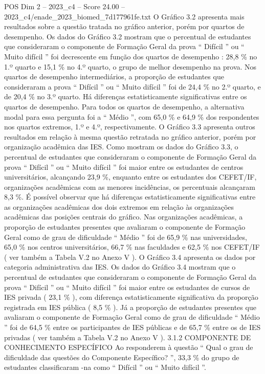 \begin{textsample}{POS Dim 2 – 2023\_c4 – Score 24.00 – 2023\_c4/enade\_2023\_biomed\_7d177961fe.txt}
O Gráfico 3.2 apresenta mais resultados sobre a questão tratada no gráfico anterior, porém por quartos de desempenho.
Os dados do Gráfico 3.2 mostram que o percentual de estudantes que consideraram o componente de Formação Geral da prova “ Difícil ” ou “ Muito difícil ” foi decrescente em função dos quartos de desempenho : 28,8 \% no 1.º quarto e 15,1 \% no 4.º quarto, o grupo de melhor desempenho na prova.
Nos quartos de desempenho intermediários, a proporção de estudantes que consideraram a prova “ Difícil ” ou “ Muito difícil ” foi de 24,4 \% no 2.º quarto, e de 20,4 \% no 3.º quarto.
Há diferenças estatisticamente significativas entre os quartos de desempenho.
Para todos os quartos de desempenho, a alternativa modal para essa pergunta foi a “ Médio ”, com 65,0 \% e 64,9 \% dos respondentes nos quartos extremos, 1.º e 4.º, respectivamente.
O Gráfico 3.3 apresenta outros resultados em relação à mesma questão retratada no gráfico anterior, porém por organização acadêmica das IES.
Como mostram os dados do Gráfico 3.3, o percentual de estudantes que consideraram o componente de Formação Geral da prova “ Difícil ” ou “ Muito difícil ” foi maior entre os estudantes de centros universitários, alcançando 23,9 \%, enquanto entre os estudantes dos CEFET/IF, organizações acadêmicas com as menores incidências, os percentuais alcançaram 8,3 \%.
É possível observar que há diferenças estatisticamente significativas entre as organizações acadêmicas dos dois extremos em relação às organizações acadêmicas das posições centrais do gráfico.
Nas organizações acadêmicas, a proporção de estudantes presentes que avaliaram o componente de Formação Geral como de grau de dificuldade “ Médio ” foi de 65,9 \% nas universidades, 65,0 \% nos centros universitários, 66,7 \% nas faculdades e 62,5 \% nos CEFET/IF ( ver também a Tabela V.2 no Anexo V ).
O Gráfico 3.4 apresenta os dados por categoria administrativa das IES.
Os dados do Gráfico 3.4 mostram que o percentual de estudantes que consideraram o componente de Formação Geral da prova “ Difícil ” ou “ Muito difícil ” foi maior entre os estudantes de cursos de IES privada ( 23,1 \% ), com diferença estatisticamente significativa da proporção registrada em IES pública ( 8,5 \% ).
Já a proporção de estudantes presentes que avaliaram o componente de Formação Geral como de grau de dificuldade “ Médio ” foi de 64,5 \% entre os participantes de IES públicas e de 65,7 \% entre os de IES privadas ( ver também a Tabela V.2 no Anexo V ). 3.1.2 COMPONENTE DE CONHECIMENTO ESPECÍFICO Ao responderem à questão “ Qual o grau de dificuldade das questões do Componente Específico? ”, 33,3 \% do grupo de estudantes classificaram -na como “ Difícil ” ou “ Muito difícil ”.

\end{textsample}
